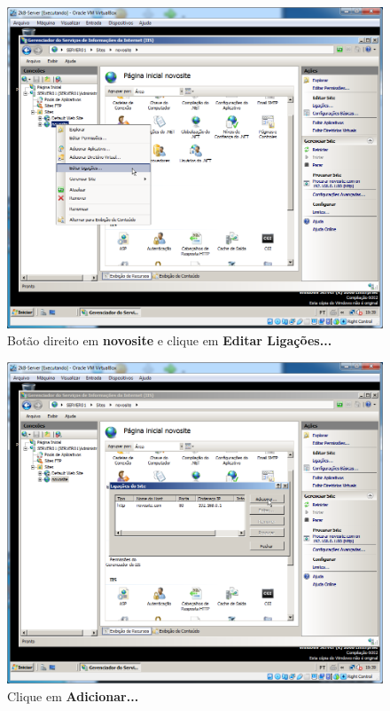 \documentclass[10pt]{article}
\begin{document}
\begin{figure}[H]
    \centering
    \caption{Botão direito em \textbf{novosite} e clique em \textbf{Editar Ligações...}}
    \label{fig:5532045}
    \includegraphics[width=\linewidth]{images/IIS/criando_um_novo_site/045.png}
\end{figure}
\begin{figure}[H]
    \centering
    \caption{Clique em \textbf{Adicionar...}}
    \label{fig:5532046}
    \includegraphics[width=\linewidth]{images/IIS/criando_um_novo_site/046.png}
\end{figure}
\end{document}
